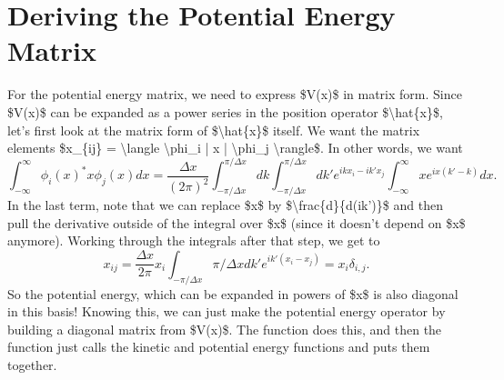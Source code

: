 \documentclass[letterpaper,10pt,english]{jupyterBook}
\begin{document}
\section{Deriving the Potential Energy Matrix}
\label{\detokenize{Section4_v2:deriving-the-potential-energy-matrix}}
\sphinxAtStartPar
For the potential energy matrix, we need to express \$V(x)\$ in matrix form. Since \$V(x)\$ can be expanded as a power series in the position operator \$\textbackslash{}hat\{x\}\$, let’s first look at the matrix form of \$\textbackslash{}hat\{x\}\$ itself. We want the matrix elements \$x\_\{ij\} = \textbackslash{}langle \textbackslash{}phi\_i | x | \textbackslash{}phi\_j \textbackslash{}rangle\$. In other words, we want
\label{equation:Section4_v2:dc5dbfcd-bf9b-4aea-8fc2-609cc9374597}\begin{equation}
\int_{-\infty}^{\infty} \phi_i(x)^\ast x \phi_j(x) dx = \frac{\Delta x}{(2\pi)^2} \int_{-\pi/\Delta x}^{\pi/\Delta x} dk \int_{-\pi/\Delta x}^{\pi/\Delta x} dk' e^{ikx_i - ik'x_j} \int_{-\infty}^{\infty} x e^{i x (k'-k)} dx.
\end{equation}
\sphinxAtStartPar
In the last term, note that we can replace \$x\$ by \$\textbackslash{}frac\{d\}\{d(ik’)\}\$ and then pull the derivative outside of the integral over \$x\$ (since it doesn’t depend on \$x\$ anymore).  Working through the integrals after that step, we get to
\label{equation:Section4_v2:069c3e0e-4ea5-4257-8621-8e9ab55d8606}\begin{equation}
x_{ij} = \frac{\Delta x}{2\pi} x_i \int_{-\pi/\Delta x}{\pi/\Delta x} dk' e^{ik'(x_i-x_j)} = x_i \delta_{i,j}.
\end{equation}
\sphinxAtStartPar
{} So the potential energy, which can be expanded in powers of \$x\$ is also diagonal in this basis! Knowing this, we can just make the potential energy operator by building a diagonal matrix from \$V(x)\$. The function  does this, and then the function  just calls the kinetic and potential energy functions and puts them together.
\end{document}
